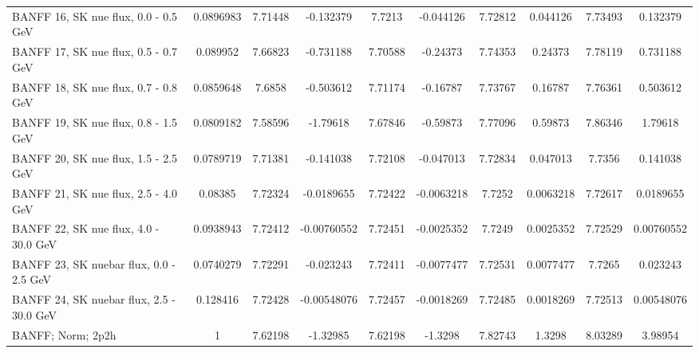 \begin{tabular}{| l | S | S  S | S  S | S  S | S  S | }
                                            BANFF 16, SK nue flux, 0.0 - 0.5 GeV &       0.0896983 &         7.71448 &       -0.132379 &          7.7213 &       -0.044126 &         7.72812 &        0.044126 &         7.73493 &        0.132379 \\ 
                                            BANFF 17, SK nue flux, 0.5 - 0.7 GeV &        0.089952 &         7.66823 &       -0.731188 &         7.70588 &        -0.24373 &         7.74353 &         0.24373 &         7.78119 &        0.731188 \\ 
                                            BANFF 18, SK nue flux, 0.7 - 0.8 GeV &       0.0859648 &          7.6858 &       -0.503612 &         7.71174 &        -0.16787 &         7.73767 &         0.16787 &         7.76361 &        0.503612 \\ 
                                            BANFF 19, SK nue flux, 0.8 - 1.5 GeV &       0.0809182 &         7.58596 &        -1.79618 &         7.67846 &        -0.59873 &         7.77096 &         0.59873 &         7.86346 &         1.79618 \\ 
                                            BANFF 20, SK nue flux, 1.5 - 2.5 GeV &       0.0789719 &         7.71381 &       -0.141038 &         7.72108 &       -0.047013 &         7.72834 &        0.047013 &          7.7356 &        0.141038 \\ 
                                            BANFF 21, SK nue flux, 2.5 - 4.0 GeV &         0.08385 &         7.72324 &      -0.0189655 &         7.72422 &      -0.0063218 &          7.7252 &       0.0063218 &         7.72617 &       0.0189655 \\ 
                                           BANFF 22, SK nue flux, 4.0 - 30.0 GeV &       0.0938943 &         7.72412 &     -0.00760552 &         7.72451 &      -0.0025352 &          7.7249 &       0.0025352 &         7.72529 &      0.00760552 \\ 
                                         BANFF 23, SK nuebar flux, 0.0 - 2.5 GeV &       0.0740279 &         7.72291 &       -0.023243 &         7.72411 &      -0.0077477 &         7.72531 &       0.0077477 &          7.7265 &        0.023243 \\ 
                                        BANFF 24, SK nuebar flux, 2.5 - 30.0 GeV &        0.128416 &         7.72428 &     -0.00548076 &         7.72457 &      -0.0018269 &         7.72485 &       0.0018269 &         7.72513 &      0.00548076 \\ 
                                                               BANFF; Norm; 2p2h &               1 &         7.62198 &        -1.32985 &         7.62198 &         -1.3298 &         7.82743 &          1.3298 &         8.03289 &         3.98954 \\ 

\end{tabular}
